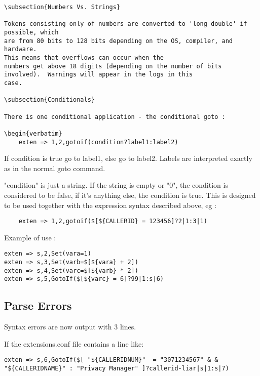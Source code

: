 \begin{verbatim}
\subsection{Numbers Vs. Strings}

Tokens consisting only of numbers are converted to 'long double' if possible, which
are from 80 bits to 128 bits depending on the OS, compiler, and hardware.
This means that overflows can occur when the
numbers get above 18 digits (depending on the number of bits involved).  Warnings will appear in the logs in this
case.

\subsection{Conditionals}

There is one conditional application - the conditional goto : 

\begin{verbatim}
	exten => 1,2,gotoif(condition?label1:label2)
\end{verbatim}

If condition is true go to label1, else go to label2. Labels are interpreted
exactly as in the normal goto command.

"condition" is just a string. If the string is empty or "0", the condition
is considered to be false, if it's anything else, the condition is true. 
This is designed to be used together with the expression syntax described 
above, eg : 

\begin{verbatim}
	exten => 1,2,gotoif($[${CALLERID} = 123456]?2|1:3|1)
\end{verbatim}

Example of use : 

\begin{verbatim}
exten => s,2,Set(vara=1)
exten => s,3,Set(varb=$[${vara} + 2])
exten => s,4,Set(varc=$[${varb} * 2])
exten => s,5,GotoIf($[${varc} = 6]?99|1:s|6)
\end{verbatim}

\subsection{Parse Errors}

Syntax errors are now output with 3 lines.

If the extensions.conf file contains a line like:

\begin{verbatim}
exten => s,6,GotoIf($[ "${CALLERIDNUM}"  = "3071234567" & &  "${CALLERIDNAME}" : "Privacy Manager" ]?callerid-liar|s|1:s|7)
\end{verbatim}

